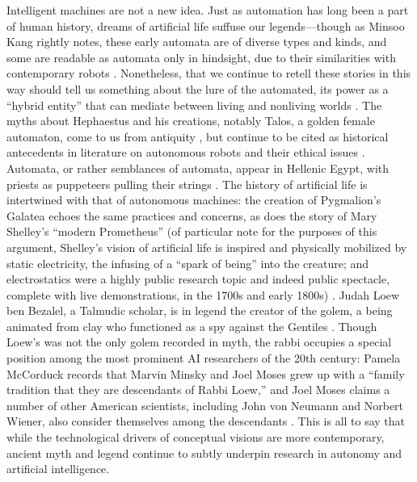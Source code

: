 Intelligent machines are not a new idea. Just as automation has long
been a part of human history, dreams of artificial life suffuse our
legends---though as Minsoo Kang
rightly notes, these early automata are of diverse types and kinds,
and some are readable as automata only in hindsight, due to their
similarities with contemporary robots \cite[p. 15]{kang}.
Nonetheless, that we continue 
to retell these stories in this way should tell us something about the
lure of the automated, its power as a ``hybrid entity'' that can
mediate between living and nonliving worlds \cite[p. 19]{kang}.
The myths about Hephaestus and 
his creations, notably Talos, a golden female automaton, come to us
from antiquity \cite[Ch. 1]{mccorduck}, but continue to be cited as
historical antecedents in 
literature on autonomous robots and their ethical issues \cite[p.
  3]{patrickLin}. Automata, 
or rather semblances of automata, appear in Hellenic Egypt, with
priests as puppeteers pulling their strings \cite[Ch. 1]{mccorduck}. The history of
artificial life is intertwined with that of autonomous machines: the
creation of Pygmalion's Galatea echoes the same practices and
concerns, as does the story of Mary Shelley's ``modern Prometheus'' (of
particular note for the purposes of this argument, Shelley's vision of
artificial life is inspired and physically mobilized by static
electricity, the infusing of a ``spark of being'' into the creature; and
electrostatics were a highly public research topic and indeed public
spectacle, complete with live demonstrations, in the 1700s and early
1800s) \cite[p. 44]{shelley}. Judah Loew ben Bezalel, a Talmudic
scholar, is in legend the 
creator of the golem, a being animated from clay who functioned as a
spy against the Gentiles \cite[Ch. 1]{mccorduck}. Though Loew's was not the only golem
recorded in myth, the rabbi occupies a special position among the most
prominent AI researchers of the 20th century: Pamela McCorduck records
that Marvin Minsky and Joel Moses grew up with a ``family tradition
that they are descendants of Rabbi Loew,'' and Joel Moses claims a number of
other American scientists, including John von Neumann and Norbert
Wiener, also consider themselves among the descendants \cite[Ch.
  1]{mccorduck}. This is all 
to say that while the technological drivers of conceptual visions are
more contemporary, ancient myth and legend continue to subtly underpin
research in autonomy and artificial intelligence.

